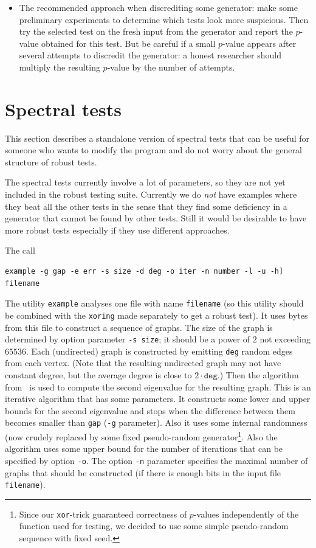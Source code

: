 \documentclass[12pt,a4paper,fullpage]{article}
\begin{document}
\begin{itemize}
\item The recommended approach when discrediting some generator: make some preliminary experiments to determine which tests look more suspicious. Then try the selected test on the fresh input from the generator and report the $p$-value obtained for this test. But be careful if a small $p$-value appears after several attempts to discredit the generator: a honest researcher should multiply the resulting $p$-value by the number of attempts.

\end{itemize}

\section{Spectral tests}

This section describes a standalone version of spectral tests that can be useful for someone who wants to modify the program and do not worry about the general structure of robust tests.

The spectral tests currently involve a lot of parameters, so they are not yet included in the robust testing suite. Currently we do \emph{not} have examples where they beat all the other tests in the sense that they find some deficiency in a generator that cannot be found by other tests. Still it would be desirable to have more robust tests especially if they use different approaches.

The call
\begin{verbatim}
example -g gap -e err -s size -d deg -o iter -n number -l -u -h] filename
\end{verbatim}

The utility \texttt{example} analyses one file with name \texttt{filename} (so this utility should be combined with the \texttt{xoring} made separately to get a robust test). It uses bytes from this file to construct a sequence of graphs. The size of the graph is determined by option parameter \texttt{-s size}; it should be a power of $2$ not exceeding $65536$. Each (undirected) graph is constructed by emitting \texttt{deg} random edges from each vertex. (Note that the resulting undirected graph may not have constant degree, but the average degree is close to $2\cdot\texttt{deg}$.) Then the algorithm from~\cite{ollivier} is used to compute the second eigenvalue for the resulting graph. This is an iterative algorithm that has some parameters. It constructs some lower and upper bounds for the second eigenvalue and stops when the difference between them becomes smaller than \texttt{gap} (\texttt{-g} parameter). Also it uses some internal randomness (now crudely replaced by some fixed pseudo-random generator\footnote{Since our \texttt{xor}-trick guaranteed correctness of $p$-values independently of the function used for testing, we decided to use some simple pseudo-random sequence with fixed seed.}. Also the algorithm uses some upper bound for the number of iterations that can be specified by option \texttt{-o}. The option \texttt{-n} parameter specifies the maximal number of graphs that should be constructed (if there is enough bits in the input file \texttt{filename}).
\end{document}
